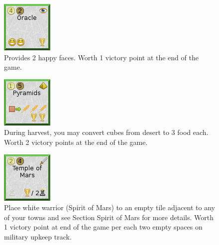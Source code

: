 \documentclass[11pt,a4paper,titlepage]{article}
\begin{document}
{  \begin{figure}[!htb]
    \begin{minipage}[c]{0.1\textwidth}
      \includegraphics[scale=.7]{doe_wonder_oracle.png}
    \end{minipage}\hfill
    \begin{minipage}[c]{0.6\textwidth}
      \captionsetup{labelformat=empty, justification=justified, singlelinecheck=false}
      \caption{Provides 2 happy faces. Worth 1 victory point at the end of the game.}
    \end{minipage}\hfill
    \label{fig:wonder_oracle}
  \end{figure}

  \begin{figure}[!htb]
    \begin{minipage}[c]{0.1\textwidth}
      \includegraphics[scale=.7]{doe_wonder_pyramids.png}
    \end{minipage}\hfill
    \begin{minipage}[c]{0.6\textwidth}
      \captionsetup{labelformat=empty, justification=justified, singlelinecheck=false}
      \caption{During harvest, you may convert cubes from desert to 3 food each. Worth 2 victory points at the end of the game.}
    \end{minipage}\hfill
    \label{fig:wonder_pyramids}
  \end{figure}

  \begin{figure}[!htb]
    \begin{minipage}[c]{0.1\textwidth}
      \includegraphics[scale=.7]{doe_wonder_temple_of_mars.png}
    \end{minipage}\hfill
    \begin{minipage}[c]{0.6\textwidth}
      \captionsetup{labelformat=empty, justification=justified, singlelinecheck=false}
      \caption{Place white warrior (Spirit of Mars) to an empty tile adjacent
        to any of your towns and see Section Spirit of Mars for more details.
        Worth 1 victory point at end of the game per each two empty spaces on military upkeep track.}
    \end{minipage}\hfill
    \label{fig:wonder_temple_of_mars}
  \end{figure}

}
\end{document}
